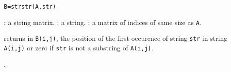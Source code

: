 
\begin{mandesc}
\end{mandesc}
\begin{calling_sequence}
\begin{verbatim}
B=strstr(A,str)
\end{verbatim}
\end{calling_sequence}

\begin{parameters}
  \begin{varlist}
    : a string matrix.
    : a string.
    : a matrix of indices of same size as \verb+A+.
  \end{varlist}
\end{parameters}

\begin{mandescription}
  returns in \verb+B(i,j)+, the position of the first occurence 
  of string \verb+str+ in string \verb+A(i,j)+ or zero if \verb+str+ 
  is not a substring of \verb+A(i,j)+.
\end{mandescription}

\begin{manseealso}
  ,   
\end{manseealso}

